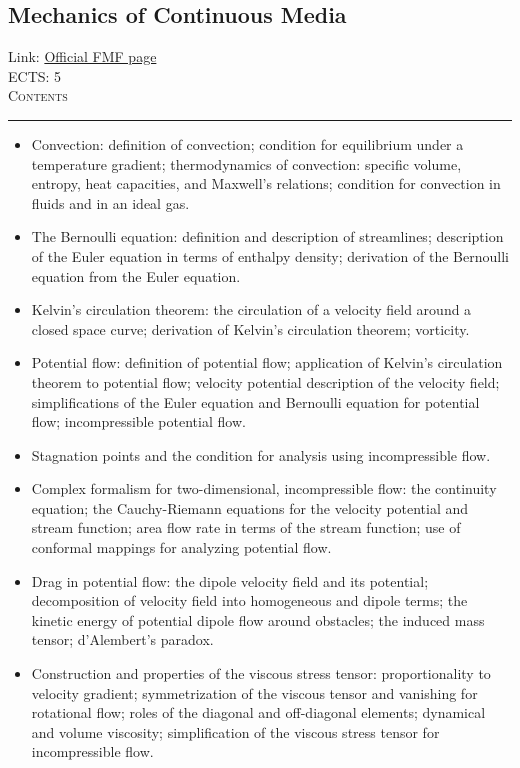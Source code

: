 \documentclass[11pt, a4paper]{article}
\newenvironment{course}[3]{
\subsection{#1}%
Link: \href{#2}{Official FMF page}\\%
ECTS: #3%
\vspace{1ex}
\\
{\large \textsc{Contents}}\\[-0.9ex]%
\rule{\textwidth}{0.5pt}
\vspace{-3ex}
}
{}
\newenvironment{chapter}[1]{
\begin{tcolorbox}[title=#1, breakable]
}
{\end{tcolorbox}}
\begin{document}
\begin{course}{Mechanics of Continuous Media}{https://www.fmf.uni-lj.si/en/study-physics/programmes/1fiz/2020/7000777/courses/1160/}{5}
\begin{chapter}{Mechanics of ideal fluids}
\begin{itemize}
            \item Convection: definition of convection; condition for equilibrium under a temperature gradient; thermodynamics of convection: specific volume, entropy, heat capacities, and Maxwell's relations; condition for convection in fluids and in an ideal gas.

            \item The Bernoulli equation: definition and description of streamlines; description of the Euler equation in terms of enthalpy density; derivation of the Bernoulli equation from the Euler equation.

            \item Kelvin's circulation theorem: the circulation of a velocity field around a closed space curve; derivation of Kelvin's circulation theorem; vorticity.

            \item Potential flow: definition of potential flow; application of Kelvin's circulation theorem to potential flow; velocity potential description of the velocity field; simplifications of the Euler equation and Bernoulli equation for potential flow; incompressible potential flow.

            \item Stagnation points and the condition for analysis using incompressible flow.

            \item Complex formalism for two-dimensional, incompressible flow: the continuity equation; the Cauchy-Riemann equations for the velocity potential and stream function; area flow rate in terms of the stream function; use of conformal mappings for analyzing potential flow.

            \item Drag in potential flow: the dipole velocity field and its potential; decomposition of velocity field into homogeneous and dipole terms; the kinetic energy of potential dipole flow around obstacles; the induced mass tensor; d'Alembert's paradox.
        
        \end{itemize}
    \end{chapter}

    \begin{chapter}{Mechanics of viscous fluids}
        \begin{itemize}
            \item Construction and properties of the viscous stress tensor: proportionality to velocity gradient; symmetrization of the viscous tensor and vanishing for rotational flow; roles of the diagonal and off-diagonal elements; dynamical and volume viscosity; simplification of the viscous stress tensor for incompressible flow.


\end{itemize}
\end{chapter}
\end{course}
\end{document}
